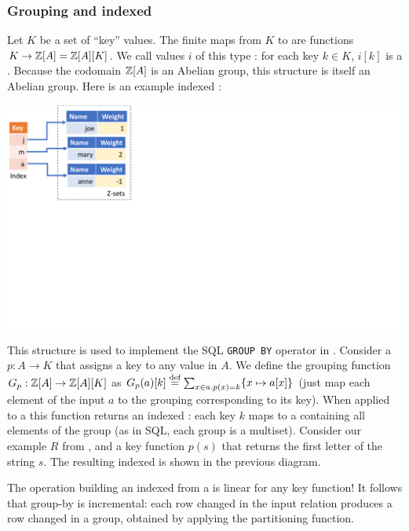 \subsubsection{Grouping and indexed \zrs}\label{sec:grouping}

Let $K$ be a set of ``key'' values.  The finite maps from $K$ to \zrs
are functions $K \to \mathbb{Z}[A] = \mathbb{Z}[A][K]$.  We call values $i$ of this
type : for each key $k \in K$, $i[k]$ is a \zr.
Because the codomain $\mathbb{Z}[A]$ is an Abelian group, this structure is
itself an Abelian group.  Here is an example indexed \zr:

\begin{center}
  \includegraphics[trim={0 4.2in 7.5in 0},clip,scale=.34]{indexed.pdf}
\end{center}

This structure is used to implement the SQL \texttt{GROUP BY} operator
in \dbsp.  Consider a  $p: A \to K$
that assigns a key to any value in $A$.  We define the grouping
function $G_p: \mathbb{Z}[A] \to \mathbb{Z}[A][K]$ as $G_p(a)[k] \stackrel{\textrm{\scriptsize def}}{=} \sum_{x \in
  a.p(x)=k}\{ x \mapsto a[x] \}$ (just map each element of the input
$a$ to the \zr grouping corresponding to its key).  When applied to a
\zr this function returns an indexed \zr: each key $k$ maps to a \zr
containing all elements of the group (as in SQL, each group is a
multiset).  Consider our example \zr $R$ from ,
and a key function $p(s)$ that returns the first letter of the string
$s$.  The resulting indexed \zr is shown in the previous diagram.

The operation building an indexed \zr from a \zr is linear for any key
function!  It follows that group-by is incremental: each row changed
in the input relation produces a row changed in a group, obtained by
applying the partitioning function.

